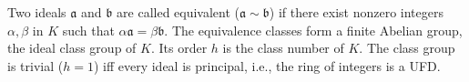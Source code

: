 Two ideals $\mathfrak{a}$ and $\mathfrak{b}$ are called equivalent ($\mathfrak{a} \sim \mathfrak{b}$) if there exist nonzero integers $\alpha, \beta$ in $K$ such that $\alpha\mathfrak{a} = \beta\mathfrak{b}$. The equivalence classes form a finite Abelian group, the ideal class group of $K$. Its order $h$ is the class number of $K$. The class group is trivial ($h=1$) iff every ideal is principal, i.e., the ring of integers is a UFD.
